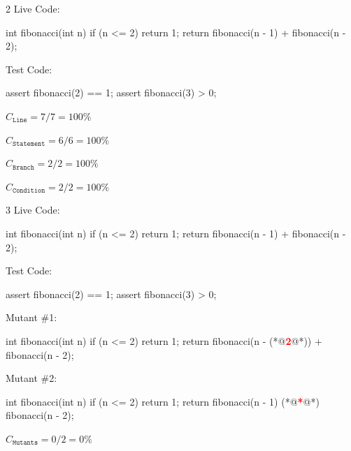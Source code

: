 \documentclass{article}
\begin{document}


\begin{multicols}{2}
Live Code:\par
{\small\begin{ffcode}
int fibonacci(int n) {
  if (n <= 2) {
    return 1;
  }
  return fibonacci(n - 1)
    + fibonacci(n - 2);
}
\end{ffcode}
}
\par\columnbreak\par
Test Code:\par
{\small\begin{ffcode}
assert fibonacci(2) == 1;
assert fibonacci(3) > 0;
\end{ffcode}
}
\( C_{\texttt{Line}} = 7/7 = 100\% \)\par
\( C_{\texttt{Statement}} = 6/6 = 100\% \)\par
\( C_{\texttt{Branch}} = 2/2 = 100\% \)\par
\( C_{\texttt{Condition}} = 2/2 = 100\% \)\par
\end{multicols}
\plush{}

\begin{pptWide}{3}
Live Code:\par
{\small\begin{ffcode}
int fibonacci(int n) {
  if (n <= 2) {
    return 1;
  }
  return fibonacci(n - 1)
    + fibonacci(n - 2);
}
\end{ffcode}
}
\par
Test Code:\par
{\small\begin{ffcode}
assert fibonacci(2) == 1;
assert fibonacci(3) > 0;
\end{ffcode}
}
\par\columnbreak\par
Mutant \#1:\par
{\small\begin{ffcode}
int fibonacci(int n) {
  if (n <= 2) {
    return 1;
  }
  return fibonacci(n - (*@\textcolor{red}{\textbf{2}}@*))
    + fibonacci(n - 2);
}
\end{ffcode}
}
\par\columnbreak\par
Mutant \#2:\par
{\small\begin{ffcode}
int fibonacci(int n) {
  if (n <= 2) {
    return 1;
  }
  return fibonacci(n - 1)
    (*@\textcolor{red}{\textbf{*}}@*) fibonacci(n - 2);
}
\end{ffcode}
}
\par
\( C_{\texttt{Mutants}} = 0/2 = 0\% \)\par
\end{pptWide}
\plush{}
\end{document}
